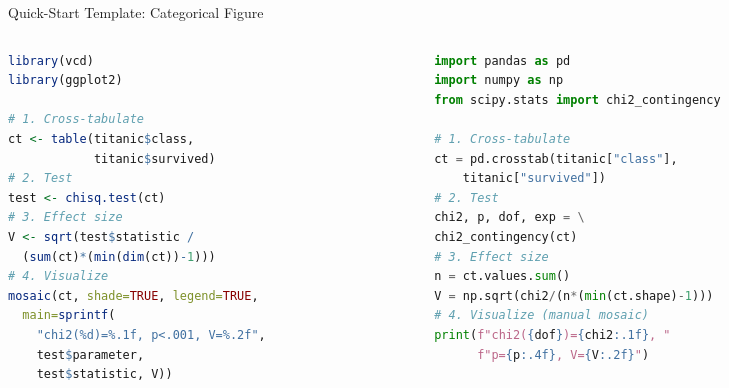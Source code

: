 \documentclass[10pt]{beamer}
\begin{document}
\begin{frame}[fragile]{Quick-Start Template: Categorical Figure}
\begin{columns}[T]
\begin{column}{0.48\textwidth}
\begin{lstlisting}[language=R, basicstyle=\ttfamily\tiny, breaklines=true]
library(vcd)
library(ggplot2)

# 1. Cross-tabulate
ct <- table(titanic$class,
            titanic$survived)
# 2. Test
test <- chisq.test(ct)
# 3. Effect size
V <- sqrt(test$statistic /
  (sum(ct)*(min(dim(ct))-1)))
# 4. Visualize
mosaic(ct, shade=TRUE, legend=TRUE,
  main=sprintf(
    "chi2(%d)=%.1f, p<.001, V=%.2f",
    test$parameter,
    test$statistic, V))
\end{lstlisting}
\end{column}
\begin{column}{0.48\textwidth}
\begin{lstlisting}[language=Python, basicstyle=\ttfamily\tiny, breaklines=true]
import pandas as pd
import numpy as np
from scipy.stats import chi2_contingency

# 1. Cross-tabulate
ct = pd.crosstab(titanic["class"],
    titanic["survived"])
# 2. Test
chi2, p, dof, exp = \
chi2_contingency(ct)
# 3. Effect size
n = ct.values.sum()
V = np.sqrt(chi2/(n*(min(ct.shape)-1)))
# 4. Visualize (manual mosaic)
print(f"chi2({dof})={chi2:.1f}, "
      f"p={p:.4f}, V={V:.2f}")
\end{lstlisting}
\end{column}
\end{columns}
\end{frame}
\end{document}
